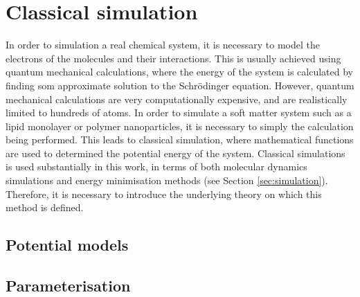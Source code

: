\section{Classical simulation}
\label{sec:classical}

In order to simulation a real chemical system, it is necessary to model the electrons of the molecules and their interactions.
This is usually achieved using quantum mechanical calculations, where the energy of the system is calculated by finding som approximate solution to the Schr\"{o}dinger equation.
However, quantum mechanical calculations are very computationally expensive, and are realistically limited to hundreds of atoms.
In order to simulate a soft matter system such as a lipid monolayer or polymer nanoparticles, it is necessary to simply the calculation being performed.
This leads to classical simulation, where mathematical functions are used to determined the potential energy of the system.
Classical simulations is used substantially in this work, in terms of both molecular dynamics simulations and energy minimisation methods (see Section \ref{sec:simulation}).
Therefore, it is necessary to introduce the underlying theory on which this method is defined.

\subsection{Potential models}


\subsection{Parameterisation}
